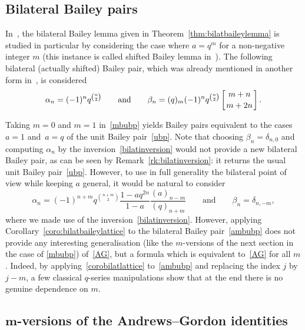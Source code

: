 \documentclass[pdftex]{sigma}
\numberwithin{equation}{section}
\begin{document}
\subsection{Bilateral Bailey pairs}

In~\cite{J}, the bilateral Bailey lemma given in Theorem~\ref{thm:bilatbaileylemma} is studied in particular by considering the case where $a=q^m$ for a non-negative integer $m$ (this instance is called shifted Bailey lemma in~\cite{J}). The following bilateral (actually shifted) Bailey pair, which was already mentioned in another form in~\cite{ASW}, is considered
\begin{equation}\label{mbubp}
\alpha_n=(-1)^nq^{\binom{n}{2}}\qquad \mbox{and}\qquad\beta_n=(q)_m(-1)^nq^{\binom{n}{2}}\left[{m+n\atop m+2n}\right].
\end{equation}

Taking $m=0$ and $m=1$ in~\eqref{mbubp} yields Bailey pairs equivalent to the cases $a=1$ and~${a=q}$ of the unit Bailey pair~\eqref{ubp}. Note that choosing $\beta_n=\delta_{n,0}$ and computing $\alpha_n$ by the inversion~\eqref{bilatinversion} would not provide a new bilateral Bailey pair, as can be seen by Remark~\ref{rk:bilatinversion}: it returns the usual unit Bailey pair~\eqref{ubp}. However, to use in full generality the bilateral point of view while keeping $a$ general, it would be natural to consider
\begin{equation}\label{ambubp}
\alpha_n=(-1)^{n+m}q^{\binom{n+m}{2}}\frac{1-aq^{2n}}{1-a}\frac{(a)_{n-m}}{(q)_{n+m}}\qquad \mbox{and}\qquad\beta_n=\delta_{n,-m},
\end{equation}
where we made use of the inversion~\eqref{bilatinversion}. However, applying Corollary~\ref{coro:bilatbaileylattice} to the bilateral Bailey pair~\eqref{ambubp} does not provide any interesting generalisation (like the $m$-versions of the next section in the case of \eqref{mbubp}) of~\eqref{AG}, but a formula which is equivalent to~\eqref{AG} for all $m$.
 Indeed, by applying~\eqref{corobilatlattice} to~\eqref{ambubp} and replacing the index $j$ by $j-m$, a few classical $q$-series manipulations show that at the end there is no genuine dependence on $m$.



\subsection[m-versions of the Andrews--Gordon identities]{$\boldsymbol{m}$-versions of the Andrews--Gordon identities}
\end{document}
